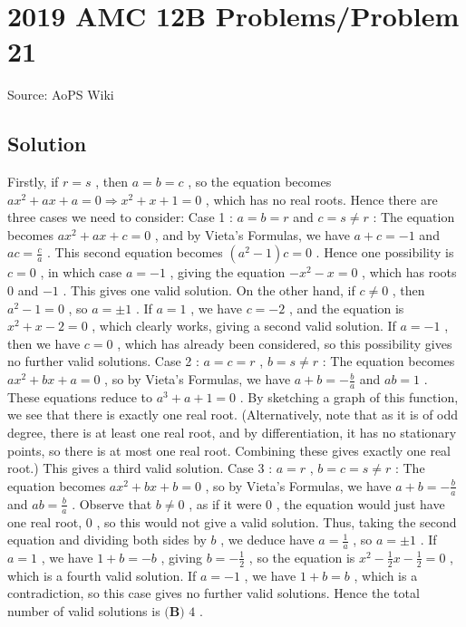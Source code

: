 \documentclass[12pt]{article}
\begin{document}
\section*{{2019 AMC 12B Problems/Problem 21}}
Source: AoPS Wiki

\subsection*{Solution}
Firstly, if $r=s$ , then $a=b=c$ , so the equation becomes $ax^2 + ax + a = 0 \Rightarrow x^2 + x + 1=0$ , which has no real roots. Hence there are three cases we need to consider: Case 1 : $a=b=r$ and $c=s \neq r$ :
The equation becomes $ax^2+ax+c=0$ , and by Vieta's Formulas, we have $a+c=-1$ and $ac = \frac{c}{a}$ . This second equation becomes $(a^2-1)c=0$ . Hence one possibility is $c=0$ , in which case $a=-1$ , giving the equation $-x^2 - x = 0$ , which has roots $0$ and ${-}1$ . This gives one valid solution. On the other hand, if $c\neq 0$ , then $a^2-1=0$ , so $a = \pm 1$ . If $a=1$ , we have $c=-2$ , and the equation is $x^2 + x - 2 = 0$ , which clearly works, giving a second valid solution. If $a=-1$ , then we have $c=0$ , which has already been considered, so this possibility gives no further valid solutions. Case 2 : $a=c=r$ , $b=s \neq r$ :
The equation becomes $ax^2 + bx + a = 0$ , so by Vieta's Formulas, we have $a+b = -\frac{b}{a}$ and $ab = 1$ . These equations reduce to $a^3 + a + 1 = 0$ . By sketching a graph of this function, we see that there is exactly one real root. (Alternatively, note that as it is of odd degree, there is at least one real root, and by differentiation, it has no stationary points, so there is at most one real root. Combining these gives exactly one real root.) This gives a third valid solution. Case 3 : $a=r$ , $b=c=s \neq r$ :
The equation becomes $ax^2 + bx+b=0$ , so by Vieta's Formulas, we have $a+b = -\frac{b}{a}$ and $ab = \frac{b}{a}$ .
Observe that $b \neq 0$ , as if it were $0$ , the equation would just have one real root, $0$ , so this would not give a valid solution. Thus, taking the second equation and dividing both sides by $b$ , we deduce have $a=\frac{1}{a}$ , so $a=\pm 1$ . If $a=1$ , we have $1+b=-b$ , giving $b=-\frac{1}{2}$ , so the equation is $x^2 - \frac{1}{2}x - \frac{1}{2} = 0$ , which is a fourth valid solution. If $a=-1$ , we have $1+b=b$ , which is a contradiction, so this case gives no further valid solutions. Hence the total number of valid solutions is $\boxed{\textbf{(B) } 4}$ .
\end{document}

